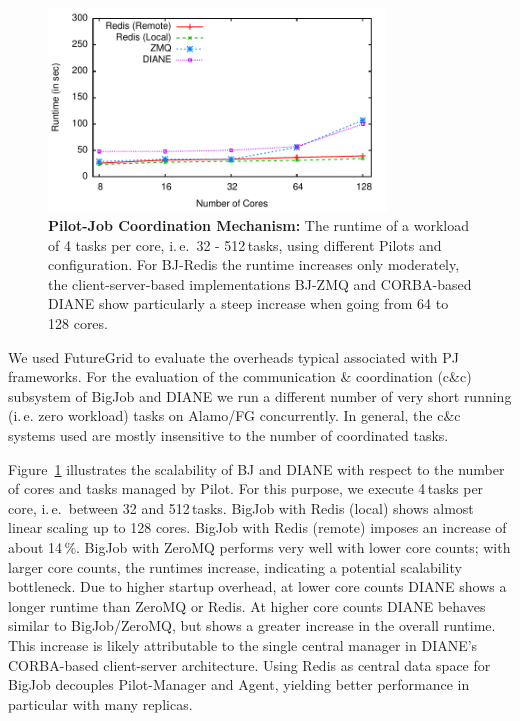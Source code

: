 \documentclass[]{paper}
\begin{document}
\begin{figure}[t] 
\centering 
\includegraphics[width=0.8\textwidth]{figures/bigjob-varying-cores-alamo-noadvert.pdf}
\caption{\textbf{Pilot-Job Coordination Mechanism:}  The runtime of a
workload of 4 tasks per core, i.\,e.\ 32 - 512\,tasks, using different Pilots
and configuration. For BJ-Redis the runtime  increases only moderately, the
client-server-based implementations BJ-ZMQ and CORBA-based DIANE show
particularly a steep increase when going from 64 to 128 cores.}
\label{fig:perf_bigjob-varying-cores} 
\end{figure}

We used FutureGrid to evaluate the overheads typical associated with PJ
frameworks. For the evaluation of the communication \& coordination (c\&c)
subsystem of BigJob and DIANE we run a different number of very short running
(i.\,e. zero workload) tasks on Alamo/FG concurrently. In general, the c\&c
systems used are mostly insensitive to the number of coordinated tasks.

Figure~\ref{fig:perf_bigjob-varying-cores} illustrates the scalability of BJ
and DIANE with respect to the number of cores and tasks managed by Pilot. For
this purpose, we execute 4\,tasks per core, i.\,e.\ between 32 and 512\,tasks.
BigJob with Redis (local) shows almost linear scaling up to 128 cores. BigJob
with Redis (remote) imposes an increase of about 14\,\%. BigJob with ZeroMQ
performs very well with lower core counts; with larger core counts, the
runtimes increase, indicating a potential scalability bottleneck. Due to
higher startup overhead, at lower core counts DIANE shows a longer runtime
than ZeroMQ or Redis. At higher core counts DIANE behaves similar to
BigJob/ZeroMQ, but shows a greater increase in the overall runtime. This
increase is likely attributable to the single central manager in DIANE's
CORBA-based client-server architecture. Using Redis as central data space for
BigJob decouples Pilot-Manager and Agent, yielding better performance in
particular with many replicas.
\end{document}
